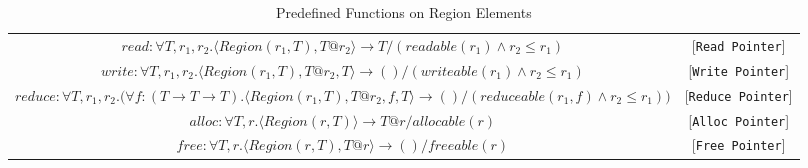 \documentclass{article}
\begin{document}
\begin{table*}
\centering
{\small
\begin{tabular}{cc}
%
% 
\begin{math}
read : \forall T,r_1,r_2. \langle Region(r_1,T), T@r_2 \rangle \rightarrow T / (readable(r_1) \wedge r_2 \le r_1)
\end{math} & [{\tt Read Pointer}] \\

%
%
\begin{math}
write : \forall T,r_1,r_2. \langle Region(r_1,T), T@r_2, T \rangle \rightarrow () / (writeable(r_1) \wedge r_2 \le r_1)
\end{math} & [{\tt Write Pointer}] \\

%
%
\begin{math}
reduce : \forall T,r_1,r_2. \big( \forall f:(T \rightarrow T \rightarrow T).  \langle Region(r_1,T), T@r_2, f, T \rangle \rightarrow () / (reduceable(r_1,f) \wedge r_2 \le r_1) \big)
\end{math} & [{\tt Reduce Pointer}] \\

%
%
\begin{math}
alloc : \forall T,r. \langle Region(r,T) \rangle \rightarrow T@r / allocable(r)
\end{math} & [{\tt Alloc Pointer}] \\

%
%
\begin{math}
free : \forall T,r. \langle Region(r,T), T@r \rangle \rightarrow () / freeable(r)
\end{math} & [{\tt Free Pointer}] 

\end{tabular}
}
\caption{Predefined Functions on Region Elements}
\end{table*}
\end{document}
